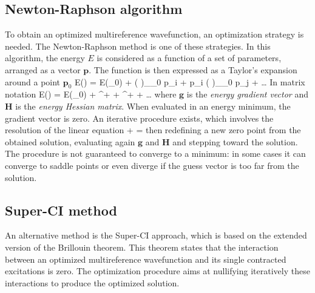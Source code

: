 \subsection*{Newton-Raphson algorithm}

To obtain an optimized multireference wavefunction, an optimization strategy
is needed. The Newton-Raphson method is one of these strategies. In this
algorithm, the energy $E$ is considered as a function of a set of
parameters, arranged as a vector $\mathbf{p}$. The function is then
expressed as a Taylor's expansion around a point $\mathbf{p}_0$
\beq
E() = E(_0) +  \left( \right)_{_0} p_i + \half {} p_i \left(  \right)_{_0} p_j + \ldots
\eeq
In matrix notation
\beq
E() = E(_0) + ^+ + \half
{}^+ + \ldots
\eeq
where $\mathbf{g}$ is the \textit{energy gradient vector} and 
$\mathbf{H}$ is the \textit{energy Hessian matrix}.
When evaluated in an energy minimum, the gradient vector is zero. An
iterative procedure exists, which involves the resolution of the linear
equation
\beq
{} +  =  
\eeq
then redefining a new zero point from the obtained solution, evaluating
again $\mathbf{g}$ and $\mathbf{H}$ and stepping toward the solution. The
procedure is not guaranteed to converge to a minimum: in some cases it can
converge to saddle points or even diverge if the guess vector is too far
from the solution.

\subsection*{Super-CI method}

An alternative method is the Super-CI approach, which is based on the
extended version of the Brillouin theorem.  This theorem states that the
interaction between an optimized multireference wavefunction and its single
contracted excitations is zero.\cite{ijqc-2-307-1968} The optimization procedure
aims at nullifying iteratively these interactions to produce the optimized
solution.


